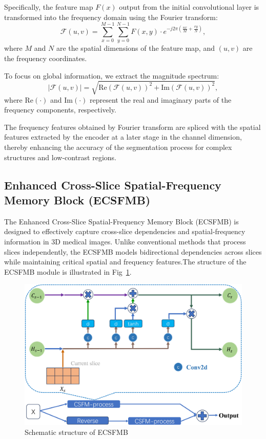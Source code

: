 \documentclass[AMA,Times1COL]{WileyNJDv5} %
\begin{document}
Specifically, the feature map \( F(x) \) output from the initial convolutional layer is transformed into the frequency domain using the Fourier transform:
\begin{equation}
\mathcal{F}(u, v) = \sum_{x=0}^{M-1} \sum_{y=0}^{N-1} F(x, y) \cdot e^{-j2\pi\left(\frac{ux}{M} + \frac{vy}{N}\right)},
\end{equation}
where \( M \) and \( N \) are the spatial dimensions of the feature map, and \((u, v)\) are the frequency coordinates.

To focus on global information, we extract the magnitude spectrum:
\begin{equation}
|\mathcal{F}(u, v)| = \sqrt{\text{Re}(\mathcal{F}(u, v))^2 + \text{Im}(\mathcal{F}(u, v))^2},
\end{equation}
where \( \text{Re}(\cdot) \) and \( \text{Im}(\cdot) \) represent the real and imaginary parts of the frequency components, respectively.

The frequency features obtained by Fourier transform are spliced with the spatial features extracted by the encoder at a later stage in the channel dimension, thereby enhancing the accuracy of the segmentation process for complex structures and low-contrast regions.

\subsection{Enhanced Cross-Slice Spatial-Frequency Memory Block (ECSFMB)}
The Enhanced Cross-Slice Spatial-Frequency Memory Block (ECSFMB) is designed to effectively capture cross-slice dependencies and spatial-frequency information in 3D medical images. Unlike conventional methods that process slices independently, the ECSFMB models bidirectional dependencies across slices while maintaining critical spatial and frequency features.The structure of the ECSFMB module is illustrated in Fig~\ref{fig:2}.

\begin{figure}[htbp]
\centerline{\includegraphics[width=0.75\linewidth]{Fig/fig2.png}}
\caption{Schematic structure of ECSFMB}
\label{fig:2}
\end{figure}
\end{document}
